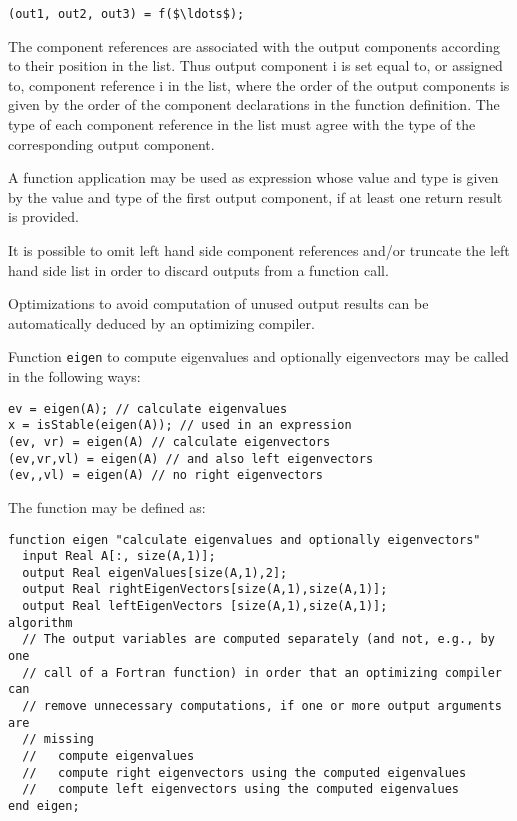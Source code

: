 \lstinline!(out1, out2, out3) = f($\ldots$);!

The component references are associated with the output components
according to their position in the list. Thus output component i is set
equal to, or assigned to, component reference i in the list, where the
order of the output components is given by the order of the component
declarations in the function definition. The type of each component
reference in the list must agree with the type of the corresponding
output component.

A function application may be used as expression whose value and type is
given by the value and type of the first output component, if at least
one return result is provided.

It is possible to omit left hand side component references and/or
truncate the left hand side list in order to discard outputs from a
function call.

\begin{nonnormative}
Optimizations to avoid computation of unused output results can
be automatically deduced by an optimizing compiler.
\end{nonnormative}

\begin{example}
Function \lstinline!eigen! to compute eigenvalues and optionally
eigenvectors may be called in the following ways:
\begin{lstlisting}[language=modelica]
ev = eigen(A); // calculate eigenvalues
x = isStable(eigen(A)); // used in an expression
(ev, vr) = eigen(A) // calculate eigenvectors
(ev,vr,vl) = eigen(A) // and also left eigenvectors
(ev,,vl) = eigen(A) // no right eigenvectors
\end{lstlisting}
The function may be defined as:
\begin{lstlisting}[language=modelica]
function eigen "calculate eigenvalues and optionally eigenvectors"
  input Real A[:, size(A,1)];
  output Real eigenValues[size(A,1),2];
  output Real rightEigenVectors[size(A,1),size(A,1)];
  output Real leftEigenVectors [size(A,1),size(A,1)];
algorithm
  // The output variables are computed separately (and not, e.g., by one
  // call of a Fortran function) in order that an optimizing compiler can
  // remove unnecessary computations, if one or more output arguments are
  // missing
  //   compute eigenvalues
  //   compute right eigenvectors using the computed eigenvalues
  //   compute left eigenvectors using the computed eigenvalues
end eigen;
\end{lstlisting}
\end{example}

